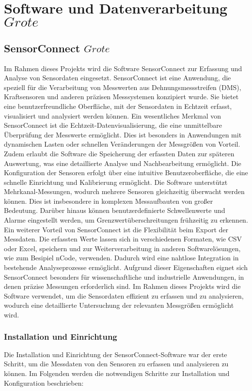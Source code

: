 \chapter{Software und Datenverarbeitung \(Grote\)}

\section{SensorConnect \(Grote\)}
Im Rahmen dieses Projekts wird die Software SensorConnect zur Erfassung und Analyse von Sensordaten eingesetzt. SensorConnect ist eine Anwendung, die speziell für die Verarbeitung von Messwerten aus Dehnungsmessstreifen (DMS), Kraftsensoren und anderen präzisen Messsystemen konzipiert wurde. Sie bietet eine benutzerfreundliche Oberfläche, mit der Sensordaten in Echtzeit erfasst, visualisiert und analysiert werden können. Ein wesentliches Merkmal von SensorConnect ist die Echtzeit-Datenvisualisierung, die eine unmittelbare Überprüfung der Messwerte ermöglicht. Dies ist besonders in Anwendungen mit dynamischen Lasten oder schnellen Veränderungen der Messgrößen von Vorteil. Zudem erlaubt die Software die Speicherung der erfassten Daten zur späteren Auswertung, was eine detaillierte Analyse und Nachbearbeitung ermöglicht. Die Konfiguration der Sensoren erfolgt über eine intuitive Benutzeroberfläche, die eine schnelle Einrichtung und Kalibrierung ermöglicht. Die Software unterstützt Mehrkanal-Messungen, wodurch mehrere Sensoren gleichzeitig überwacht werden können. Dies ist insbesondere in komplexen Messaufbauten von großer Bedeutung. Darüber hinaus können benutzerdefinierte Schwellenwerte und Alarme eingestellt werden, um Grenzwertüberschreitungen frühzeitig zu erkennen. Ein weiterer Vorteil von SensorConnect ist die Flexibilität beim Export der Messdaten. Die erfassten Werte lassen sich in verschiedenen Formaten, wie CSV oder Excel, speichern und zur Weiterverarbeitung in anderen Softwarelösungen, wie zum Besipiel nCode, verwenden. Dadurch wird eine nahtlose Integration in bestehende Analyseprozesse ermöglicht. Aufgrund dieser Eigenschaften eignet sich SensorConnect besonders für wissenschaftliche und industrielle Anwendungen, in denen präzise Messungen erforderlich sind. Im Rahmen dieses Projekts wird die Software verwendet, um die Sensordaten effizient zu erfassen und zu analysieren, wodurch eine detaillierte Untersuchung der relevanten Messgrößen ermöglicht wird.

\subsection{Installation und Einrichtung}
Die Installation und Einrichtung der SensorConnect-Software war der erste Schritt, um die Messdaten von den Sensoren zu erfassen und analysieren zu können. Im Folgenden werden die notwendigen Schritte zur Installation und Konfiguration beschrieben:

